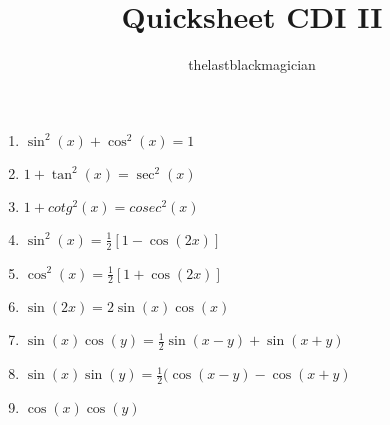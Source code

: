 \documentclass{article}
\title{Quicksheet CDI II}
\author{thelastblackmagician }
\begin{document}
\begin{enumerate}
  \item $\sin^2 (x) + \cos^2(x) = 1 $ \\
  \item $1 + \tan^2(x) = \sec^2(x)$ \\
  \item $1 + cotg^2(x) = cosec^2 (x)$ \\
  \item $\sin^2(x) = \frac{1}{2} \left[ 1 - \cos(2x)\right]$ \\
  \item $\cos^2(x) = \frac{1}{2} \left[ 1+\cos(2x) \right] $ \\
  \item $\sin(2x) = 2\sin(x)\cos(x)$ \\
  \item $\sin(x)\cos(y) = \frac{1}{2} \sin(x-y) + \sin(x+y)$ \\
  \item $\sin(x)\sin(y) = \frac{1}{2} (\cos(x-y) - \cos(x+y)$ \\
  \item $\cos(x)\cos(y)$ 
\end{enumerate}
\end{document}
